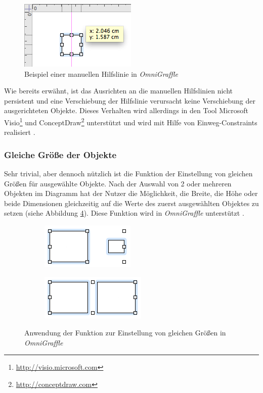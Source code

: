 \begin{figure}[hbt]
    \centering
    \includegraphics{resources/omnigraffle-manual-guides.png}
    \caption{Beispiel einer manuellen Hilfslinie in \textit{OmniGraffle}}
    \label{fig:omnigraffle-manual-guides}
\end{figure}

Wie bereits erwähnt, ist das Ausrichten an die manuellen Hilfslinien nicht persistent und eine Verschiebung der Hilfslinie verursacht keine Verschiebung der ausgerichteten Objekte. Dieses Verhalten wird allerdings in den Tool Microsoft Visio\footnote{\url{http://visio.microsoft.com}} und ConceptDraw\footnote{\url{http://conceptdraw.com}} unterstützt und wird mit Hilfe von Einweg-Constraints realisiert \cite[S.20]{Maier12A-Pattern-based}.

\subsubsection{Gleiche Größe der Objekte}

Sehr trivial, aber dennoch nützlich ist die Funktion der Einstellung von gleichen Größen für ausgewählte Objekte. Nach der Auswahl von 2 oder mehreren Objekten im Diagramm hat der Nutzer die Möglichkeit, die Breite, die Höhe oder beide Dimensionen gleichzeitig auf die Werte des zuerst ausgewählten Objektes zu setzen (siehe Abbildung \ref{fig:omnigraffle-make-same-size}). Diese Funktion wird in \textit{OmniGraffle} unterstützt \cite{Olsen10OmniGraffle}.

\begin{figure}[hbt]
    \newcommand{\subfigurewidth}{0.5\textwidth}
    \begin{subfigure}{\subfigurewidth}
        \centering
        \includegraphics{resources/omnigraffle-make-same-size-a}
        \caption{}
        \label{fig:omnigraffle-make-same-size-a}
    \end{subfigure}
    \begin{subfigure}{\subfigurewidth}
        \centering
        \includegraphics{resources/omnigraffle-make-same-size-b}
        \caption{}
        \label{fig:omnigraffle-make-same-size-b}
    \end{subfigure}
    \caption{Anwendung der Funktion zur Einstellung von gleichen Größen in \textit{OmniGraffle}}
    \label{fig:omnigraffle-make-same-size}
\end{figure}

